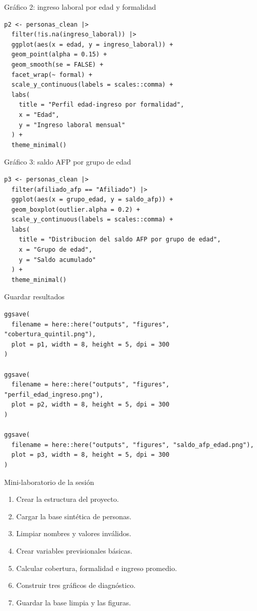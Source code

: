\documentclass[aspectratio=169,11pt]{beamer}
\begin{document}
\begin{frame}[fragile]{Gráfico 2: ingreso laboral por edad y formalidad}
\begin{lstlisting}
p2 <- personas_clean |>
  filter(!is.na(ingreso_laboral)) |>
  ggplot(aes(x = edad, y = ingreso_laboral)) +
  geom_point(alpha = 0.15) +
  geom_smooth(se = FALSE) +
  facet_wrap(~ formal) +
  scale_y_continuous(labels = scales::comma) +
  labs(
    title = "Perfil edad-ingreso por formalidad",
    x = "Edad",
    y = "Ingreso laboral mensual"
  ) +
  theme_minimal()
\end{lstlisting}
\end{frame}

\begin{frame}[fragile]{Gráfico 3: saldo AFP por grupo de edad}
\begin{lstlisting}
p3 <- personas_clean |>
  filter(afiliado_afp == "Afiliado") |>
  ggplot(aes(x = grupo_edad, y = saldo_afp)) +
  geom_boxplot(outlier.alpha = 0.2) +
  scale_y_continuous(labels = scales::comma) +
  labs(
    title = "Distribucion del saldo AFP por grupo de edad",
    x = "Grupo de edad",
    y = "Saldo acumulado"
  ) +
  theme_minimal()
\end{lstlisting}
\end{frame}

\begin{frame}[fragile]{Guardar resultados}
\begin{lstlisting}
ggsave(
  filename = here::here("outputs", "figures", "cobertura_quintil.png"),
  plot = p1, width = 8, height = 5, dpi = 300
)

ggsave(
  filename = here::here("outputs", "figures", "perfil_edad_ingreso.png"),
  plot = p2, width = 8, height = 5, dpi = 300
)

ggsave(
  filename = here::here("outputs", "figures", "saldo_afp_edad.png"),
  plot = p3, width = 8, height = 5, dpi = 300
)
\end{lstlisting}
\end{frame}

\begin{frame}{Mini-laboratorio de la sesión}
\begin{enumerate}
  \item Crear la estructura del proyecto.
  \item Cargar la base sintética de personas.
  \item Limpiar nombres y valores inválidos.
  \item Crear variables previsionales básicas.
  \item Calcular cobertura, formalidad e ingreso promedio.
  \item Construir tres gráficos de diagnóstico.
  \item Guardar la base limpia y las figuras.
\end{enumerate}
\end{frame}
\end{document}
